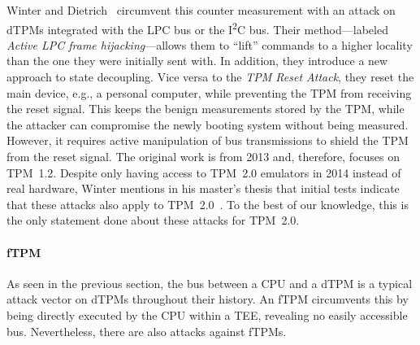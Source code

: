 Winter and Dietrich~\cite{Winter2013} circumvent this counter measurement with an attack on \acp{dTPM} integrated with the LPC bus or the I\textsuperscript{2}C bus.
Their method---labeled \emph{Active LPC frame hijacking}---allows them to ``lift'' commands to a higher locality than the one they were initially sent with.
In addition, they introduce a new approach to state decoupling.
Vice versa to the \emph{TPM Reset Attack}, they reset the main device, e.g., a personal computer, while preventing the TPM from receiving the reset signal.
This keeps the benign measurements stored by the TPM, while the attacker can compromise the newly booting system without being measured.
However, it requires active manipulation of bus transmissions to shield the \ac{TPM} from the reset signal.
The original work is from 2013 and, therefore, focuses on TPM~1.2.
Despite only having access to TPM~2.0 emulators in 2014 instead of real hardware, Winter mentions in his master's thesis that initial tests indicate that these attacks also apply to TPM~2.0~\cite{winterMA2014}.
To the best of our knowledge, this is the only statement done about these attacks for TPM~2.0.



\paragraph{\Acl{fTPM}}

As seen in the previous section, the bus between a CPU and a \ac{dTPM} is a typical attack vector on \acp{dTPM} throughout their history.
An \ac{fTPM} circumvents this by being directly executed by the CPU within a \ac{TEE}, revealing no easily accessible bus.
Nevertheless, there are also attacks against \acp{fTPM}.

